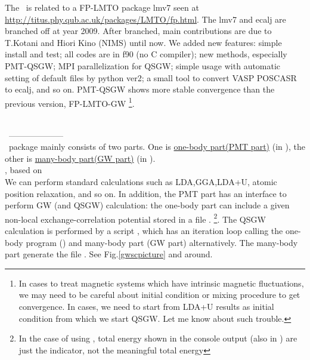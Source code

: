 The \ecalj\ is related to a FP-LMTO package lmv7 seen at\\
\url{http://titus.phy.qub.ac.uk/packages/LMTO/fp.html}. 
The lmv7 and ecalj are branched off at year 2009.
After branched, main contributions are 
due to T.Kotani and Hiori Kino (NIMS) until now. 
We added new features: simple install and test;
all codes are in f90 (no C compiler);
new methods, especially PMT-QSGW; MPI parallelization for QSGW;
simple usage with automatic setting of default files by python ver2;
a small tool to convert VASP POSCASR to ecalj, and so on.
PMT-QSGW shows more stable convergence than the previous version, FP-LMTO-GW
\footnote{In cases to treat magnetic
systems which have intrinsic magnetic fluctuations, 
we may need to be careful about initial condition or mixing procedure
to get convergence. In cases, we need to start from LDA+U results as initial
condition from which we start QSGW. Let me know about such trouble.}.

\ \\

\ -------------------- \\
\noindent \ecalj\ package mainly consists of two parts.
One is \underline{one-body part(PMT part)} (in ), 
the other is \underline{many-body part(GW part)} (in ).\\


, based on \cite{kotani2015pmt}\\
We can perform standard calculations such
as LDA,GGA,LDA+U, atomic position relaxation, and so on.
In addition, the PMT part has an interface to perform GW (and QSGW) calculation:
the one-body part can include a given non-local
exchange-correlation potential stored in a file .
\footnote{In the case of using , 
total energy shown in the console output 
(also in ) are just the indicator, not the meaningful total energy}.
The QSGW calculation is performed by a script , which
has an iteration loop calling the one-body program () and
many-body part (GW part) alternatively. The many-body part generate
the file . See Fig.\ref{gwscpicture} and around.\\

